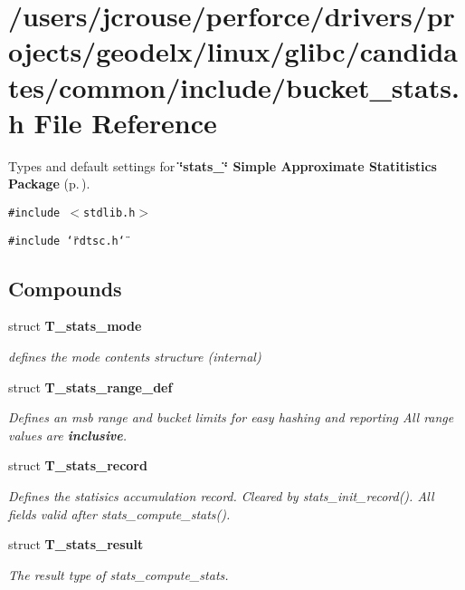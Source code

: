 \section{/users/jcrouse/perforce/drivers/projects/geodelx/linux/glibc/candidates/common/include/bucket\_\-stats.h File Reference}
\label{bucket__stats_8h}
Types and default settings for {\bf \char`\"{}stats\_\-\char`\"{} Simple Approximate Statitistics Package} {\rm (p.\,\pageref{group__stats})}. 


{\tt \#include $<$stdlib.h$>$}\par
{\tt \#include \char`\"{}rdtsc.h\char`\"{}}\par
\subsection*{Compounds}
\begin{CompactItemize}
\item 
struct {\bf T\_\-stats\_\-mode}
\begin{CompactList}\small\item\em defines the mode contents structure (internal)\item\end{CompactList}\item 
struct {\bf T\_\-stats\_\-range\_\-def}
\begin{CompactList}\small\item\em Defines an msb range and bucket limits for easy hashing and reporting All range values are {\bf inclusive}.\item\end{CompactList}\item 
struct {\bf T\_\-stats\_\-record}
\begin{CompactList}\small\item\em Defines the statisics accumulation record. Cleared by stats\_\-init\_\-record(). All fields valid after stats\_\-compute\_\-stats().\item\end{CompactList}\item 
struct {\bf T\_\-stats\_\-result}
\begin{CompactList}\small\item\em The result type of stats\_\-compute\_\-stats.\item\end{CompactList}\end{CompactItemize}
